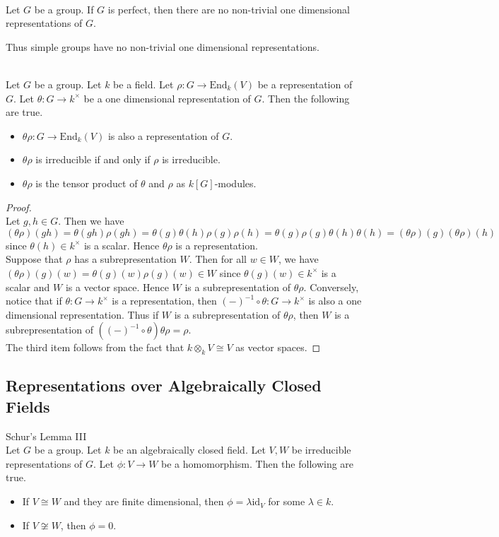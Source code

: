 \documentclass[a4paper]{article}
\begin{document}
\begin{lmm}{}{}\\
Let $G$ be a group. If $G$ is perfect, then there are no non-trivial one dimensional representations of $G$. 
\end{lmm}

Thus simple groups have no non-trivial one dimensional representations. 

\begin{prp}{}{}\\
Let $G$ be a group. Let $k$ be a field. Let $\rho:G\to\text{End}_k(V)$ be a representation of $G$. Let $\theta:G\to k^\times$ be a one dimensional representation of $G$. Then the following are true. 
\begin{itemize}
\item $\theta\rho:G\to\text{End}_k(V)$ is also a representation of $G$. 
\item $\theta\rho$ is irreducible if and only if $\rho$ is irreducible. 
\item $\theta\rho$ is the tensor product of $\theta$ and $\rho$ as $k[G]$-modules. 
\end{itemize}
\begin{proof}\\
Let $g,h\in G$. Then we have $$(\theta\rho)(gh)=\theta(gh)\rho(gh)=\theta(g)\theta(h)\rho(g)\rho(h)=\theta(g)\rho(g)\theta(h)\theta(h)=(\theta\rho)(g)(\theta\rho)(h)$$ since $\theta(h)\in k^\times$ is a scalar. Hence $\theta\rho$ is a representation. \\

Suppose that $\rho$ has a subrepresentation $W$. Then for all $w\in W$, we have $(\theta\rho)(g)(w)=\theta(g)(w)\rho(g)(w)\in W$ since $\theta(g)(w)\in k^\times$ is a scalar and $W$ is a vector space. Hence $W$ is a subrepresentation of $\theta\rho$. Conversely, notice that if $\theta:G\to k^\times$ is a representation, then $(-)^{-1}\circ\theta:G\to k^\times$ is also a one dimensional representation. Thus if $W$ is a subrepresentation of $\theta\rho$, then $W$ is a subrepresentation of $((-)^{-1}\circ\theta)\theta\rho=\rho$. \\

The third item follows from the fact that $k\otimes_kV\cong V$ as vector spaces. 
\end{proof}
\end{prp}

\subsection{Representations over Algebraically Closed Fields}
\begin{lmm}{Schur's Lemma III}{}\\
Let $G$ be a group. Let $k$ be an algebraically closed field. Let $V,W$ be irreducible representations of $G$. Let $\phi:V\to W$ be a homomorphism. Then the following are true. 
\begin{itemize}
\item If $V\cong W$ and they are finite dimensional, then $\phi=\lambda\text{id}_V$ for some $\lambda\in k$. 
\item If $V\not\cong W$, then $\phi=0$. 
\end{itemize}
\end{lmm}
\end{document}
